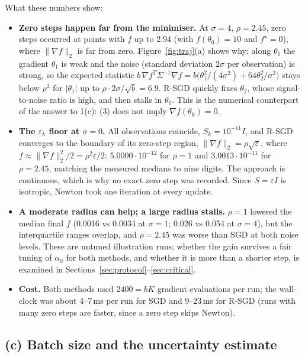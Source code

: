 \documentclass[11pt,a4paper]{article}
\newcommand{\norm}[1]{\lVert #1\rVert_2}
\begin{document}
What these numbers show:
\begin{itemize}
\item \textbf{Zero steps happen far from the minimiser.} At $\sigma=4$, $\rho=2.45$,
zero steps occurred at points with $f$ up to $2.94$ (with $f(\theta_0)=10$ and
$f^\star=0$), where $\norm{\nabla f}$ is far from zero. Figure~\ref{fig:traj}(a) shows
why: along $\theta_1$ the gradient $\theta_1$ is weak and the noise (standard deviation
$2\sigma$ per observation) is strong, so the expected statistic
$b\,\nabla f^T\Sigma^{-1}\nabla f=b\big(\theta_1^2/(4\sigma^2)+64\theta_2^2/\sigma^2\big)$
stays below $\rho^2$ for $|\theta_1|$ up to $\rho\cdot2\sigma/\sqrt b=6.9$. R-SGD quickly
fixes $\theta_2$, whose signal-to-noise ratio is high, and then stalls in $\theta_1$.
This is the numerical counterpart of the answer to 1(c): (3) does not imply
$\nabla f(\theta_k)=0$.
\item \textbf{The $\varepsilon_k$ floor at $\sigma=0$.} All observations coincide,
$S_k=10^{-11}I$, and R-SGD converges to the boundary of its zero-step region,
$\norm{\nabla f}=\rho\sqrt{\varepsilon}$, where $f\approx\norm{\nabla f}^2/2=\rho^2\varepsilon/2$:
$5.0000\cdot10^{-12}$ for $\rho=1$ and $3.0013\cdot10^{-11}$ for $\rho=2.45$, matching
the measured medians to nine digits. The approach is continuous, which is why no exact
zero step was recorded. Since $S=\varepsilon I$ is isotropic, Newton took one iteration
at every update.
\item \textbf{A moderate radius can help; a large radius stalls.} $\rho=1$ lowered the
median final $f$ (0.0016 vs 0.0034 at $\sigma=1$; 0.026 vs 0.054 at $\sigma=4$), but the
interquartile ranges overlap, and $\rho=2.45$ was worse than SGD at both noise levels.
These are untuned illustration runs; whether the gain survives a fair tuning of
$\alpha_0$ for both methods, and whether it is more than a shorter step, is examined
in Sections~\ref{sec:protocol}--\ref{sec:critical}.
\item \textbf{Cost.} Both methods used $2400=bK$ gradient evaluations per run; the
wall-clock was about 4--7\,ms per run for SGD and 9--23\,ms for R-SGD (runs with many
zero steps are faster, since a zero step skips Newton).
\end{itemize}

\subsection{(c) Batch size and the uncertainty estimate}\label{sec:batch}
\end{document}
